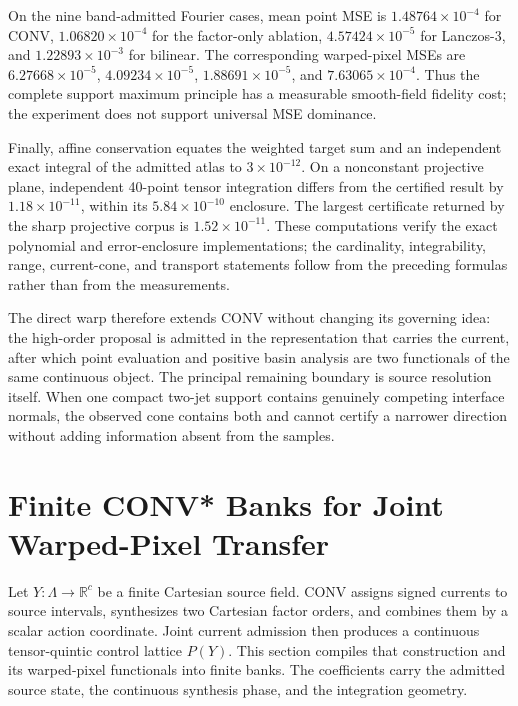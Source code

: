 \documentclass[journal]{IEEEtran}
\begin{document}
On the nine band-admitted Fourier cases, mean point MSE is
\(1.48764\times10^{-4}\) for CONV, \(1.06820\times10^{-4}\) for the
factor-only ablation, \(4.57424\times10^{-5}\) for Lanczos-3, and
\(1.22893\times10^{-3}\) for bilinear.  The corresponding warped-pixel MSEs
are \(6.27668\times10^{-5}\), \(4.09234\times10^{-5}\),
\(1.88691\times10^{-5}\), and \(7.63065\times10^{-4}\).  Thus the complete
support maximum principle has a measurable smooth-field fidelity cost; the
experiment does not support universal MSE dominance.

Finally, affine conservation equates the weighted target sum and an
independent exact integral of the admitted atlas to \(3\times10^{-12}\).  On
a nonconstant projective plane, independent 40-point tensor integration
differs from the certified result by \(1.18\times10^{-11}\), within its
\(5.84\times10^{-10}\) enclosure.  The largest certificate returned by the
sharp projective corpus is \(1.52\times10^{-11}\).  These computations verify
the exact polynomial and error-enclosure implementations; the cardinality,
integrability, range, current-cone, and transport statements follow from the
preceding formulas rather than from the measurements.

The direct warp therefore extends CONV without changing its governing idea:
the high-order proposal is admitted in the representation that carries the
current, after which point evaluation and positive basin analysis are two
functionals of the same continuous object.  The principal remaining boundary
is source resolution itself.  When one compact two-jet support contains
genuinely competing interface normals, the observed cone contains both and
cannot certify a narrower direction without adding information absent from
the samples.
\section{Finite CONV* Banks for Joint Warped-Pixel Transfer}
\label{app:convstarwarp}

Let $Y:\Lambda\to\mathbb R^c$ be a finite Cartesian source field. CONV
assigns signed currents to source intervals, synthesizes two Cartesian factor
orders, and combines them by a scalar action coordinate. Joint current
admission then produces a continuous tensor-quintic control lattice $P(Y)$.
This section compiles that construction and its warped-pixel functionals into
finite banks. The coefficients carry the admitted source state, the
continuous synthesis phase, and the integration geometry.
\end{document}
